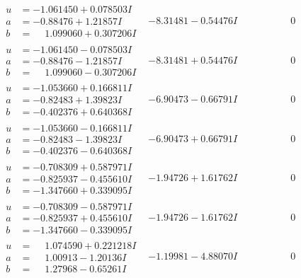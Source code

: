 \documentclass[1p]{elsarticle_modified}
\theoremstyle{definition}
\begin{document}
$$\begin{array}{c|c|c}
\begin{aligned}
u &= -1.061450 + 0.078503 I \\
a &= -0.88476 + 1.21857 I \\
b &= \phantom{-}1.099060 + 0.307206 I\end{aligned}
 & -8.31481 - 0.54476 I & \phantom{-0.000000 } 0 \\ \hline\begin{aligned}
u &= -1.061450 - 0.078503 I \\
a &= -0.88476 - 1.21857 I \\
b &= \phantom{-}1.099060 - 0.307206 I\end{aligned}
 & -8.31481 + 0.54476 I & \phantom{-0.000000 } 0 \\ \hline\begin{aligned}
u &= -1.053660 + 0.166811 I \\
a &= -0.82483 + 1.39823 I \\
b &= -0.402376 + 0.640368 I\end{aligned}
 & -6.90473 - 0.66791 I & \phantom{-0.000000 } 0 \\ \hline\begin{aligned}
u &= -1.053660 - 0.166811 I \\
a &= -0.82483 - 1.39823 I \\
b &= -0.402376 - 0.640368 I\end{aligned}
 & -6.90473 + 0.66791 I & \phantom{-0.000000 } 0 \\ \hline\begin{aligned}
u &= -0.708309 + 0.587971 I \\
a &= -0.825937 - 0.455610 I \\
b &= -1.347660 + 0.339095 I\end{aligned}
 & -1.94726 + 1.61762 I & \phantom{-0.000000 } 0 \\ \hline\begin{aligned}
u &= -0.708309 - 0.587971 I \\
a &= -0.825937 + 0.455610 I \\
b &= -1.347660 - 0.339095 I\end{aligned}
 & -1.94726 - 1.61762 I & \phantom{-0.000000 } 0 \\ \hline\begin{aligned}
u &= \phantom{-}1.074590 + 0.221218 I \\
a &= \phantom{-}1.00913 - 1.20136 I \\
b &= \phantom{-}1.27968 - 0.65261 I\end{aligned}
 & -1.19981 - 4.88070 I & \phantom{-0.000000 } 0 \\ \hline\begin{aligned}

\end{aligned}
\end{array}$$
\end{document}
